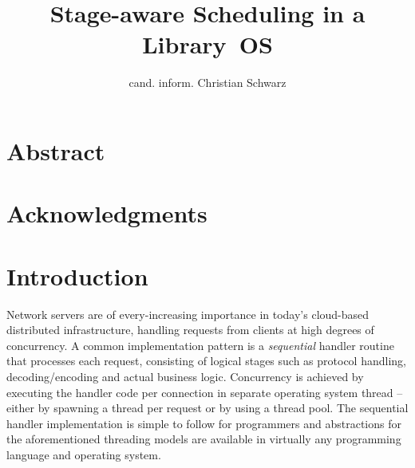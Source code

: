 \documentclass[12pt,a4paper]{book}
\begin{document}
\frontmatter
{}

\title{Stage-aware Scheduling in a Library~OS}
\author{cand. inform. Christian Schwarz}
\maketitle



\chapter{Abstract}
\chapter{Acknowledgments}

\mainmatter
\cleardoublepage
{}
{}
\tableofcontents

\chapter{Introduction}
Network servers are of every-increasing importance in today's cloud-based distributed infrastructure, handling requests from clients at high degrees of concurrency.
A common implementation pattern is a \emph{sequential} handler routine that processes each request, consisting of logical stages such as protocol handling, decoding/encoding and actual business logic.
Concurrency is achieved by executing the handler code per connection in separate operating system thread -- either by spawning a thread per request or by using a thread pool.
The sequential handler implementation is simple to follow for programmers and abstractions for the aforementioned threading models are available in virtually any programming language and operating system.~\cite{flashwebsrv,c10k}
\end{document}
